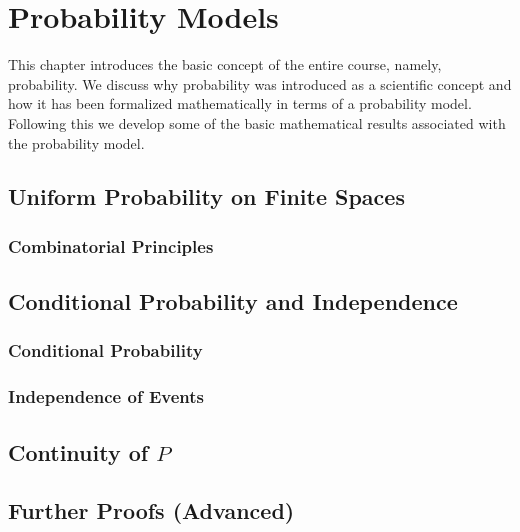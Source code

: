 \chapter{Probability Models}\label{chap:probability_models}
\minitoc
This chapter introduces the basic concept of the entire course, namely, probability. We discuss why probability was introduced as a scientific concept and how it has been formalized mathematically in terms of a probability model. Following this we develop some of the basic mathematical results associated with the probability model.







\section{Uniform Probability on Finite Spaces}\label{unif_prob_fint_spc}
\lipsum[1-10]

\subsection{Combinatorial Principles}
\lipsum[1-10]

\section{Conditional Probability and Independence}\label{cond_prob_indp}
\lipsum[1-10]

\subsection{Conditional Probability}
\lipsum[1-10]

\subsection{Independence of Events}
\lipsum[1-10]

\section{Continuity of $P$}
\lipsum[1-10]

\section{Further Proofs (Advanced)}\label{ch2:adv_proofs}
\lipsum[1-10]